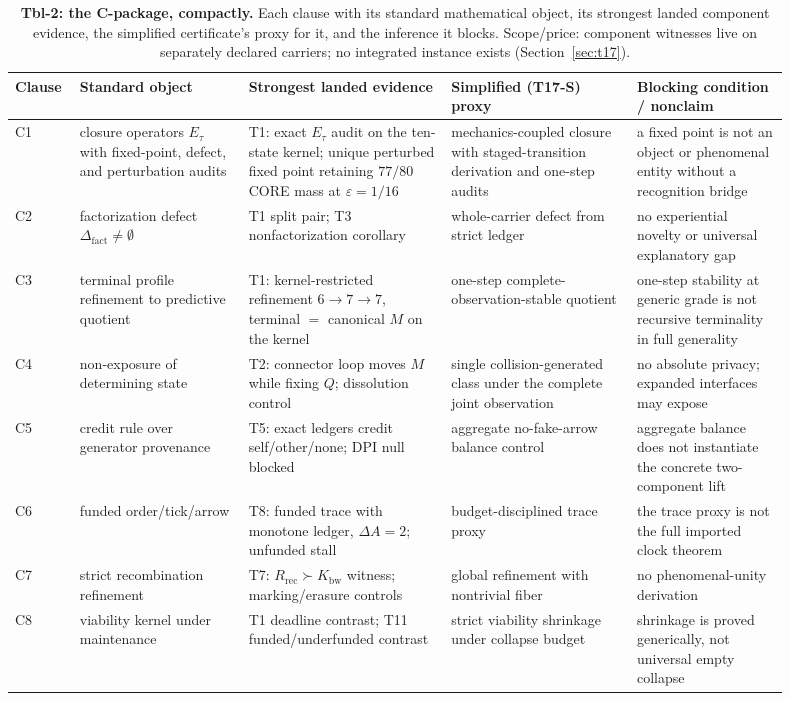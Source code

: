 \documentclass[11pt]{article}
\newcommand{\Kbw}{K_{\mathrm{bw}}}
\newcommand{\Rrec}{R_{\mathrm{rec}}}
\newcommand{\Dfact}{\Delta_{\mathrm{fact}}}
\theoremstyle{definition}
\begin{document}
\begin{table}[t]
\centering\footnotesize
\begin{tabular}{p{0.06\linewidth}p{0.2\linewidth}p{0.24\linewidth}p{0.22\linewidth}p{0.18\linewidth}}
\toprule
Clause & Standard object & Strongest landed evidence & Simplified (T17-S) proxy & Blocking condition / nonclaim \\
\midrule
C1 & closure operators $E_\tau$ with fixed-point, defect, and perturbation audits & T1: exact $E_\tau$ audit on the ten-state kernel; unique perturbed fixed point retaining $77/80$ CORE mass at $\varepsilon=1/16$ & mechanics-coupled closure with staged-transition derivation and one-step audits & a fixed point is not an object or phenomenal entity without a recognition bridge \\
C2 & factorization defect $\Dfact\neq\emptyset$ & T1 split pair; T3 nonfactorization corollary & whole-carrier defect from strict ledger & no experiential novelty or universal explanatory gap \\
C3 & terminal profile refinement to predictive quotient & T1: kernel-restricted refinement $6\to7\to7$, terminal $=$ canonical $M$ on the kernel & one-step complete-observation-stable quotient & one-step stability at generic grade is not recursive terminality in full generality \\
C4 & non-exposure of determining state & T2: connector loop moves $M$ while fixing $Q$; dissolution control & single collision-generated class under the complete joint observation & no absolute privacy; expanded interfaces may expose \\
C5 & credit rule over generator provenance & T5: exact ledgers credit self/other/none; DPI null blocked & aggregate no-fake-arrow balance control & aggregate balance does not instantiate the concrete two-component lift \\
C6 & funded order/tick/arrow & T8: funded trace with monotone ledger, $\Delta A = 2$; unfunded stall & budget-disciplined trace proxy & the trace proxy is not the full imported clock theorem \\
C7 & strict recombination refinement & T7: $\Rrec\succ\Kbw$ witness; marking/erasure controls & global refinement with nontrivial fiber & no phenomenal-unity derivation \\
C8 & viability kernel under maintenance & T1 deadline contrast; T11 funded/underfunded contrast & strict viability shrinkage under collapse budget & shrinkage is proved generically, not universal empty collapse \\
\bottomrule
\end{tabular}
\caption{\textbf{Tbl-2: the C-package, compactly.} Each clause with its
standard mathematical object, its strongest landed component evidence, the
simplified certificate's proxy for it, and the inference it blocks.
Scope/price: component witnesses live on separately declared carriers; no
integrated instance exists (Section~\ref{sec:t17}).}
\label{tbl:cpackage}
\end{table}
\end{document}
